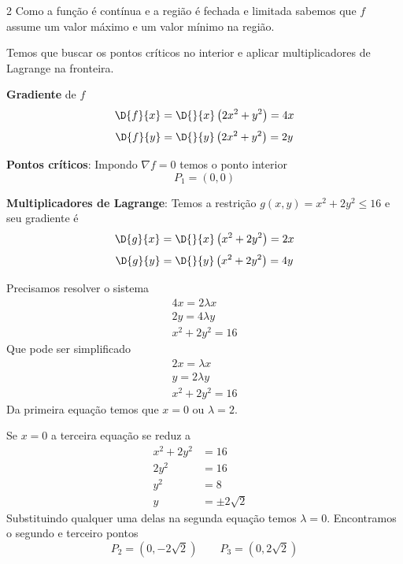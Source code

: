 \documentclass[a4paper,12pt,fleqn]{article}
\begin{document}
\begin{answer}
  \setlength\columnsep{3em}
  \setlength{\jot}{5pt}
  \begin{multicols}{2}
    \raggedcolumns
    Como a função é contínua e a região é fechada e limitada sabemos que
    $f$ assume um valor máximo e um valor mínimo na região.

    \vspace{\baselineskip}
    Temos que buscar os pontos críticos no interior e aplicar multiplicadores
    de Lagrange na fronteira.

    \vspace{\baselineskip}
    \textbf{Gradiente} de $f$
    \[
      \D{f}{x}
      = \D{}{x}\left(2x^2 + y^2\right)
      = 4x
    \]
    \[
      \D{f}{y}
      = \D{}{y}\left(2x^2 + y^2\right)
      = 2y
    \]

    \vspace{\baselineskip}
    \textbf{Pontos críticos}:
    Impondo \(\nabla f = 0\) temos o ponto interior
    \[
      P_1 = (0, 0)
    \]

    \vspace{\baselineskip}
    \textbf{Multiplicadores de Lagrange}:
    Temos a restrição \(g(x, y) = x^2 + 2y^2 \leq 16\) e seu gradiente é
    \[
      \D{g}{x}
      = \D{}{x}\left(x^2 + 2y^2\right)
      = 2x
    \]
    \[
      \D{g}{y}
      = \D{}{y}\left(x^2 + 2y^2\right)
      = 4y
    \]

    Precisamos resolver o sistema
    \begin{gather*}
      4x = 2\lambda x \\
      2y = 4\lambda y \\
      x^2 + 2y^2 = 16
    \end{gather*}
    Que pode ser simplificado
    \begin{gather*}
      2x =  \lambda x \\
      y = 2\lambda y \\
      x^2 + 2y^2 = 16
    \end{gather*}
    Da primeira equação temos que $x=0$ ou $\lambda=2$.

    Se $x=0$ a terceira equação se reduz a
    \begin{align*}
      x^2 + 2y^2 & = 16           &  \\
      2y^2       & = 16           &  \\
      y^2        & = 8            &  \\
      y          & = \pm 2\sqrt{2} &
    \end{align*}
    Substituindo qualquer uma delas na segunda equação
    temos $\lambda = 0$. Encontramos o segundo e terceiro pontos
    \[
      P_2 = \left(0, -2\sqrt{2}\right)
      \qquad
      P_3 = \left(0, 2\sqrt{2}\right)
    \]


\end{multicols}
\end{answer}
\end{document}
